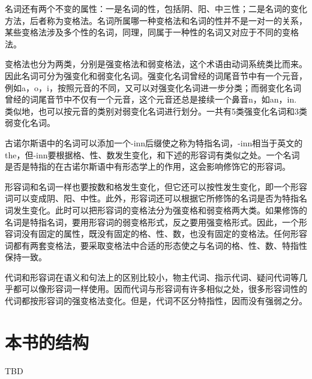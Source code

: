 名词还有两个不变的属性：一是名词的性，包括阴、阳、中三性；二是名词的变化方法，后者称为变格法。名词所属哪一种变格法和名词的性并不是一对一的关系，某些变格法涉及多个性的名词，同理，同属于一种性的名词又对应于不同的变格法。

变格法也分为两类，分别是强变格法和弱变格法，这个术语由动词系统类比而来。因此名词可分为强变化和弱变化名词。强变化名词曾经的词尾音节中有一个元音，例如a，o，i，按照元音的不同，又可以对强变化名词进一步分类；而弱变化名词曾经的词尾音节中不仅有一个元音，这个元音还总是接续一个鼻音n，如an，in. 类似地，也可以按元音的类别对弱变化名词进行划分。一共有5类强变化名词和3类弱变化名词。

古诺尔斯语中的名词可以添加一个-inn后缀使之称为特指名词，-inn相当于英文的the，但-inn要根据格、性、数发生变化，和下述的形容词有类似之处。一个名词是否是特指的在古诺尔斯语中有形态学上的作用，这会影响修饰它的形容词。

形容词和名词一样也要按数和格发生变化，但它还可以按性发生变化，即一个形容词可以变成阴、阳、中性。此外，形容词还可以根据它所修饰的名词是否为特指名词发生变化。此时可以把形容词的变格法分为强变格和弱变格两大类。如果修饰的名词是特指名词，要用形容词的弱变格形式，反之要用强变格形式。因此，一个形容词没有固定的属性，既没有固定的格、性、数，也没有固定的变格法。任何形容词都有两套变格法，要采取变格法中合适的形态使之与名词的格、性、数、特指性保持一致。

代词和形容词在语义和句法上的区别比较小，物主代词、指示代词、疑问代词等几乎都可以像形容词一样使用。因而代词与形容词有许多相似之处，很多形容词性的代词都按形容词的强变格法变化。但是，代词不区分特指性，因而没有强弱之分。

\section*{本书的结构}
TBD

